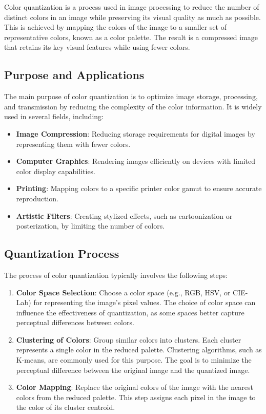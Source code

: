 Color quantization is a process used in image processing to reduce the number of distinct colors in an image while preserving its visual quality as much as possible. This is achieved by mapping the colors of the image to a smaller set of representative colors, known as a color palette. The result is a compressed image that retains its key visual features while using fewer colors.

\subsection{Purpose and Applications}

The main purpose of color quantization is to optimize image storage, processing, and transmission by reducing the complexity of the color information. It is widely used in several fields, including:

\begin{itemize}
    \item \textbf{Image Compression}: Reducing storage requirements for digital images by representing them with fewer colors.
    \item \textbf{Computer Graphics}: Rendering images efficiently on devices with limited color display capabilities.
    \item \textbf{Printing}: Mapping colors to a specific printer color gamut to ensure accurate reproduction.
    \item \textbf{Artistic Filters}: Creating stylized effects, such as cartoonization or posterization, by limiting the number of colors.
\end{itemize}

\subsection{Quantization Process}

The process of color quantization typically involves the following steps:

\begin{enumerate}
    \item \textbf{Color Space Selection}: Choose a color space (e.g., RGB, HSV, or CIE-Lab) for representing the image's pixel values. The choice of color space can influence the effectiveness of quantization, as some spaces better capture perceptual differences between colors.
    
    \item \textbf{Clustering of Colors}: Group similar colors into clusters. Each cluster represents a single color in the reduced palette. Clustering algorithms, such as K-means, are commonly used for this purpose. The goal is to minimize the perceptual difference between the original image and the quantized image.
    
    \item \textbf{Color Mapping}: Replace the original colors of the image with the nearest colors from the reduced palette. This step assigns each pixel in the image to the color of its cluster centroid.
\end{enumerate}

